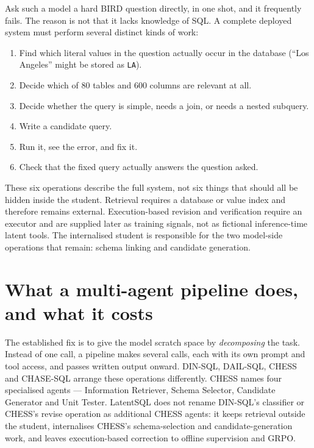 \documentclass[11pt]{article}
\theoremstyle{definition}
\begin{document}
Ask such a model a hard BIRD question directly, in one shot, and it frequently fails. The reason is not that it lacks knowledge of SQL. A complete deployed system must perform several distinct kinds of work:

\begin{enumerate}
\item Find which literal values in the question actually occur in the database (``Los Angeles'' might be stored as \texttt{LA}).
\item Decide which of $80$ tables and $600$ columns are relevant at all.
\item Decide whether the query is simple, needs a join, or needs a nested subquery.
\item Write a candidate query.
\item Run it, see the error, and fix it.
\item Check that the fixed query actually answers the question asked.
\end{enumerate}

These six operations describe the full system, not six things that should all be hidden inside the student. Retrieval requires a database or value index and therefore remains external. Execution-based revision and verification require an executor and are supplied later as training signals, not as fictional inference-time latent tools. The internalised student is responsible for the two model-side operations that remain: schema linking and candidate generation.

\section{What a multi-agent pipeline does, and what it costs}

The established fix is to give the model scratch space by \emph{decomposing} the task. Instead of one call, a pipeline makes several calls, each with its own prompt and tool access, and passes written output onward. DIN-SQL, DAIL-SQL, CHESS and CHASE-SQL arrange these operations differently. CHESS names four specialised agents --- Information Retriever, Schema Selector, Candidate Generator and Unit Tester. LatentSQL does not rename DIN-SQL's classifier or CHESS's revise operation as additional CHESS agents: it keeps retrieval outside the student, internalises CHESS's schema-selection and candidate-generation work, and leaves execution-based correction to offline supervision and GRPO.

\begin{center}
\end{center}
\end{document}
